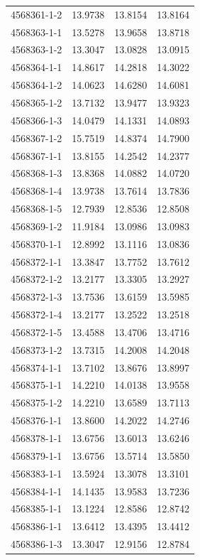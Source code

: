 \begin{longtable}{lrrr}
4568361-1-2 & 13.9738 & 13.8154 & 13.8164 \\
4568363-1-1 & 13.5278 & 13.9658 & 13.8718 \\
4568363-1-2 & 13.3047 & 13.0828 & 13.0915 \\
4568364-1-1 & 14.8617 & 14.2818 & 14.3022 \\
4568364-1-2 & 14.0623 & 14.6280 & 14.6081 \\
4568365-1-2 & 13.7132 & 13.9477 & 13.9323 \\
4568366-1-3 & 14.0479 & 14.1331 & 14.0893 \\
4568367-1-2 & 15.7519 & 14.8374 & 14.7900 \\
4568367-1-1 & 13.8155 & 14.2542 & 14.2377 \\
4568368-1-3 & 13.8368 & 14.0882 & 14.0720 \\
4568368-1-4 & 13.9738 & 13.7614 & 13.7836 \\
4568368-1-5 & 12.7939 & 12.8536 & 12.8508 \\
4568369-1-2 & 11.9184 & 13.0986 & 13.0983 \\
4568370-1-1 & 12.8992 & 13.1116 & 13.0836 \\
4568372-1-1 & 13.3847 & 13.7752 & 13.7612 \\
4568372-1-2 & 13.2177 & 13.3305 & 13.2927 \\
4568372-1-3 & 13.7536 & 13.6159 & 13.5985 \\
4568372-1-4 & 13.2177 & 13.2522 & 13.2518 \\
4568372-1-5 & 13.4588 & 13.4706 & 13.4716 \\
4568373-1-2 & 13.7315 & 14.2008 & 14.2048 \\
4568374-1-1 & 13.7102 & 13.8676 & 13.8997 \\
4568375-1-1 & 14.2210 & 14.0138 & 13.9558 \\
4568375-1-2 & 14.2210 & 13.6589 & 13.7113 \\
4568376-1-1 & 13.8600 & 14.2022 & 14.2746 \\
4568378-1-1 & 13.6756 & 13.6013 & 13.6246 \\
4568379-1-1 & 13.6756 & 13.5714 & 13.5850 \\
4568383-1-1 & 13.5924 & 13.3078 & 13.3101 \\
4568384-1-1 & 14.1435 & 13.9583 & 13.7236 \\
4568385-1-1 & 13.1224 & 12.8586 & 12.8742 \\
4568386-1-1 & 13.6412 & 13.4395 & 13.4412 \\
4568386-1-3 & 13.3047 & 12.9156 & 12.8784 \\

\end{longtable}

